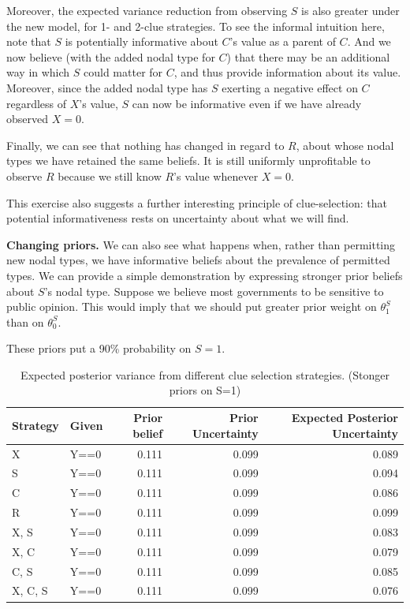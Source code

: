 \documentclass[
  12pt,
]{book}
\begin{document}
Moreover, the expected variance reduction from observing \(S\) is also greater under the new model, for 1- and 2-clue strategies. To see the informal intuition here, note that \(S\) is potentially informative about \(C\)'s value as a parent of \(C\). And we now believe (with the added nodal type for \(C\)) that there may be an additional way in which \(S\) could matter for \(C\), and thus provide information about its value. Moreover, since the added nodal type has \(S\) exerting a negative effect on \(C\) regardless of \(X\)'s value, \(S\) can now be informative even if we have already observed \(X=0\).

Finally, we can see that nothing has changed in regard to \(R\), about whose nodal types we have retained the same beliefs. It is still uniformly unprofitable to observe \(R\) because we still know \(R\)'s value whenever \(X=0\).

This exercise also suggests a further interesting principle of clue-selection: that potential informativeness rests on uncertainty about what we will find.

\textbf{Changing priors.} We can also see what happens when, rather than permitting new nodal types, we have informative beliefs about the prevalence of permitted types. We can provide a simple demonstration by expressing stronger prior beliefs about \(S\)'s nodal type. Suppose we believe most governments to be sensitive to public opinion. This would imply that we should put greater prior weight on \(\theta^S_1\) than on \(\theta^S_0\).

These priors put a 90\% probability on \(S=1\).

\begin{table}

\caption{\label{tab:scxrylearning3}Expected posterior variance from different clue selection strategies. (Stonger priors on S=1)}
\centering
\begin{tabular}[t]{l|l|r|r|r}
\hline
Strategy & Given & Prior belief & Prior Uncertainty & Expected Posterior Uncertainty\\
\hline
X & Y==0 & 0.111 & 0.099 & 0.089\\
\hline
S & Y==0 & 0.111 & 0.099 & 0.094\\
\hline
C & Y==0 & 0.111 & 0.099 & 0.086\\
\hline
R & Y==0 & 0.111 & 0.099 & 0.099\\
\hline
X, S & Y==0 & 0.111 & 0.099 & 0.083\\
\hline
X, C & Y==0 & 0.111 & 0.099 & 0.079\\
\hline
C, S & Y==0 & 0.111 & 0.099 & 0.085\\
\hline
X, C, S & Y==0 & 0.111 & 0.099 & 0.076\\
\hline
\end{tabular}
\end{table}
\end{document}
